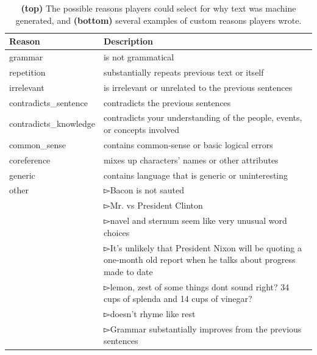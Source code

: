 \begin{table}[tb]
    \centering
    \small
    \begin{tabular}{l|p{30em}}
    \toprule
    Reason & Description \\
    \midrule
    grammar &  is not grammatical \\
    repetition & substantially repeats previous text or itself \\
    irrelevant & is irrelevant or unrelated to the previous sentences \\
    contradicts\_sentence & contradicts the previous sentences \\
    contradicts\_knowledge & contradicts your understanding of the people, events, or concepts involved \\
    common\_sense & contains common-sense or basic logical errors \\
    coreference & mixes up characters' names or other attributes \\
    generic & contains language that is generic or uninteresting \\
    \midrule
    other & $\whitepointerright$Bacon is not sauted \\
     & $\whitepointerright$Mr. vs President Clinton \\
     & $\whitepointerright$navel and sternum seem like very unusual word choices \\
     & $\whitepointerright$It's unlikely that President Nixon will be quoting a one-month old report when he talks about progress made to date   \\
     & $\whitepointerright$lemon, zest of some things dont sound right? 34 cups of splenda and 14 cups of vinegar? \\
     & $\whitepointerright$doesn't rhyme like rest \\
     & $\whitepointerright$Grammar substantially improves from the previous sentences \\
    \bottomrule
    \end{tabular}
    \caption{\textbf{(top)} The possible reasons players could select for why text was machine generated, and \textbf{(bottom)} several examples of custom reasons players wrote.}
    \label{tab:reasons_text}
\end{table}

